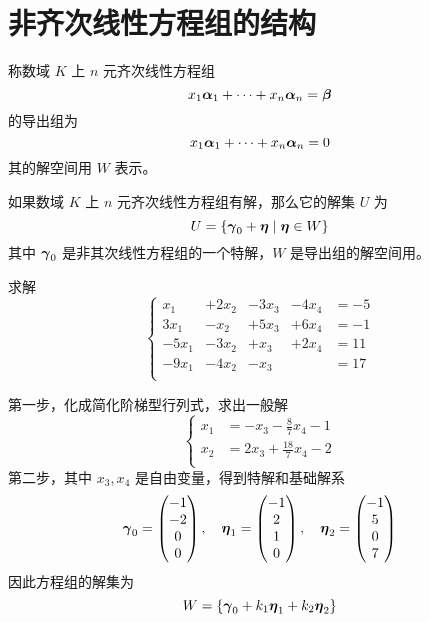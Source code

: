 \section{非齐次线性方程组的结构}

称数域 $K$ 上 $n$ 元齐次线性方程组
\[x_1\boldsymbol{\alpha}_1 + \cdots + x_n\boldsymbol{\alpha}_n = \boldsymbol{\beta}\]
的导出组为
\[x_1\boldsymbol{\alpha}_1 + \cdots + x_n\boldsymbol{\alpha}_n = 0\]
其的解空间用 $W$ 表示。

\begin{theorem}
	如果数域 $K$ 上 $n$ 元齐次线性方程组有解，那么它的解集 $U$ 为
	\[U = \{\boldsymbol{\gamma}_0 + \boldsymbol{\eta} \mid \boldsymbol{\eta} \in W\}\]
	其中 $\boldsymbol{\gamma}_0$ 是非其次线性方程组的一个特解，$W$ 是导出组的解空间用。
\end{theorem}

\begin{example}
	求解
	\[ \left\{
		\begin{aligned}
			x_1   & + 2x_2 & - 3x_3 & - 4x_4 & = -5 \\
			3x_1  & - x_2  & + 5x_3 & + 6x_4 & = -1 \\
			-5x_1 & - 3x_2 & + x_3  & + 2x_4 & = 11 \\
			-9x_1 & - 4x_2 & - x_3  &        & = 17 \\
		\end{aligned} \right. \]
\end{example}

第一步，化成简化阶梯型行列式，求出一般解
\[ \left\{
	\begin{aligned}
		x_1 & = -x_3 - \frac{8}{7}x_4 - 1  \\
		x_2 & = 2x_3 + \frac{18}{7}x_4 - 2 \\
	\end{aligned} \right. \]
第二步，其中 $x_3, x_4$ 是自由变量，得到特解和基础解系
\[ \boldsymbol{\gamma}_0 = \left(\begin{matrix}
			-1 \\ -2 \\ 0 \\ 0
		\end{matrix}\right), \quad \boldsymbol{\eta}_1 = \left(\begin{matrix}
			-1 \\ 2 \\ 1 \\ 0
		\end{matrix}\right), \quad \boldsymbol{\eta}_2 = \left(\begin{matrix}
			-1 \\ 5 \\ 0 \\ 7
		\end{matrix}\right) \]
因此方程组的解集为
\[ W = \{ \boldsymbol{\gamma}_0 + k_1 \boldsymbol{\eta}_1 + k_2 \boldsymbol{\eta}_2 \} \]

